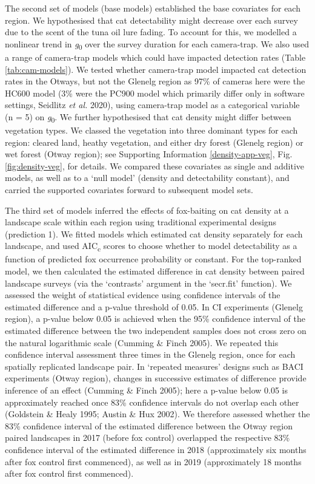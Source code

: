 \documentclass[preprint, 3p, authoryear]{elsarticle} %
\begin{document}
The second set of models (base models) established the base covariates for each region. We hypothesised that cat detectability might decrease over each survey due to the scent of the tuna oil lure fading. To account for this, we modelled a nonlinear trend in \emph{g}\textsubscript{0} over the survey duration for each camera-trap. We also used a range of camera-trap models which could have impacted detection rates (Table \ref{tab:cam-models}). We tested whether camera-trap model impacted cat detection rates in the Otways, but not the Glenelg region as 97\% of cameras here were the HC600 model (3\% were the PC900 model which primarily differ only in software settings, Seidlitz \emph{et al.} 2020), using camera-trap model as a categorical variable (n = 5) on \emph{g}\textsubscript{0}. We further hypothesised that cat density might differ between vegetation types. We classed the vegetation into three dominant types for each region: cleared land, heathy vegetation, and either dry forest (Glenelg region) or wet forest (Otway region); see Supporting Information \ref{density-app-veg}, Fig. \ref{fig:density-veg}, for details. We compared these covariates as single and additive models, as well as to a `null model' (density and detectability constant), and carried the supported covariates forward to subsequent model sets.

The third set of models inferred the effects of fox-baiting on cat density at a landscape scale within each region using traditional experimental designs (prediction 1). We fitted models which estimated cat density separately for each landscape, and used AIC\textsubscript{c} scores to choose whether to model detectability as a function of predicted fox occurrence probability or constant. For the top-ranked model, we then calculated the estimated difference in cat density between paired landscape surveys (via the `contrasts' argument in the `secr.fit' function). We assessed the weight of statistical evidence using confidence intervals of the estimated difference and a p-value threshold of 0.05. In CI experiments (Glenelg region), a p-value below 0.05 is achieved when the 95\% confidence interval of the estimated difference between the two independent samples does not cross zero on the natural logarithmic scale (Cumming \& Finch 2005). We repeated this confidence interval assessment three times in the Glenelg region, once for each spatially replicated landscape pair. In `repeated measures' designs such as BACI experiments (Otway region), changes in successive estimates of difference provide inference of an effect (Cumming \& Finch 2005); here a p-value below 0.05 is approximately reached once 83\% confidence intervals do not overlap each other (Goldstein \& Healy 1995; Austin \& Hux 2002). We therefore assessed whether the 83\% confidence interval of the estimated difference between the Otway region paired landscapes in 2017 (before fox control) overlapped the respective 83\% confidence interval of the estimated difference in 2018 (approximately six months after fox control first commenced), as well as in 2019 (approximately 18 months after fox control first commenced).
\end{document}
